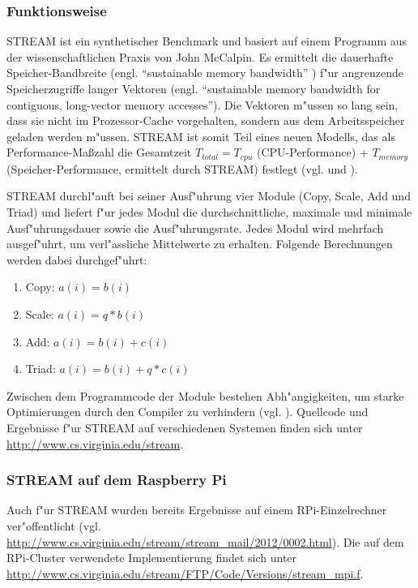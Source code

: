 \subsubsection{Funktionsweise}\label{Funktion-STREAM}

STREAM ist ein synthetischer Benchmark und basiert auf einem Programm aus der wissenschaftlichen Praxis von John McCalpin. Es ermittelt die dauerhafte Speicher-Bandbreite (engl. "`sustainable memory bandwidth"' \cite{mcc95}) f"ur angrenzende Speicherzugriffe langer Vektoren (engl. "`sustainable memory bandwidth for contiguous, long-vector memory accesses"'\cite{mcc95}). Die Vektoren m"ussen so lang sein, dass sie nicht im Prozessor-Cache vorgehalten, sondern aus dem Arbeitsspeicher geladen werden m"ussen. STREAM ist somit Teil eines neuen Modells, das als Performance-Ma\ss zahl die Gesamtzeit $T_{total} = T_{cpu}$ (CPU-Performance) + $T_{memory}$ (Speicher-Performance, ermittelt durch STREAM) festlegt (vgl. \cite{mcc95} und \cite{mcc05}). 

STREAM durchl"auft bei seiner Ausf"uhrung vier Module (Copy, Scale, Add und Triad) und liefert f"ur jedes Modul die durchschnittliche, maximale und minimale Ausf"uhrungsdauer sowie die Ausf"uhrungsrate. Jedes Modul wird mehrfach ausgef"uhrt, um verl"assliche Mittelwerte zu erhalten. Folgende Berechnungen werden dabei durchgef"uhrt: 
\begin{enumerate}
	\item Copy: $a(i) = b(i)$
    \item Scale: $a(i) = q\ast b(i)$
    \item Add: $a(i) = b(i) + c(i)$
    \item Triad: $a(i) = b(i) + q\ast c(i)$
\end{enumerate}
Zwischen dem Programmcode der Module bestehen Abh"angigkeiten, um starke Optimierungen durch den Compiler zu verhindern (vgl. \cite{mcc05}). Quellcode und Ergebnisse f"ur STREAM auf verschiedenen Systemen finden sich unter \url{http://www.cs.virginia.edu/stream}.   

\subsubsection{STREAM auf dem Raspberry Pi}\label{STREAM-RPi}

Auch f"ur STREAM wurden bereits Ergebnisse auf einem RPi-Einzelrechner ver"offentlicht (vgl. \url{http://www.cs.virginia.edu/stream/stream_mail/2012/0002.html}). Die auf dem RPi-Cluster verwendete Implementierung findet sich unter \url{http://www.cs.virginia.edu/stream/FTP/Code/Versions/stream_mpi.f}.  

